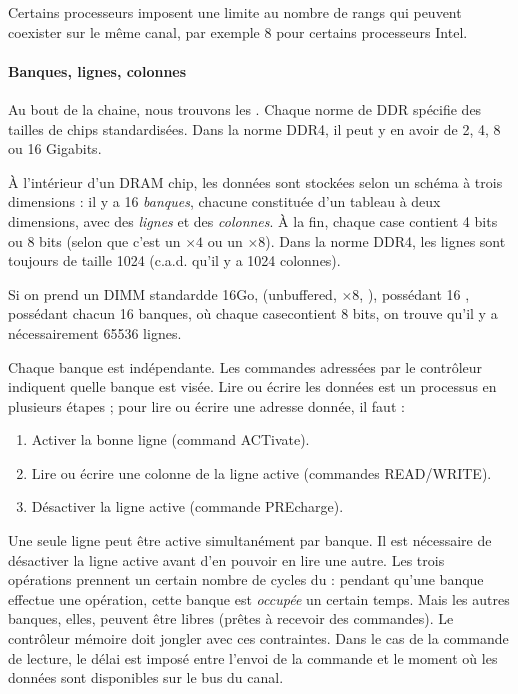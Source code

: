 \begin{danger}
  Certains processeurs imposent une limite au nombre de rangs qui peuvent
  coexister sur le même canal, par exemple 8 pour certains processeurs Intel.
\end{danger}

\paragraph{Banques, lignes, colonnes} Au bout de la chaine, nous trouvons les
. Chaque norme de DDR spécifie des tailles de chips
standardisées. Dans la norme DDR4, il peut y en avoir de 2, 4, 8 ou 16 Gigabits.

À l'intérieur d'un DRAM chip, les données sont stockées selon un schéma à trois
dimensions : il y a 16 \emph{banques}, chacune constituée d'un tableau à deux
dimensions, avec des \emph{lignes} et des \emph{colonnes}. À la fin, chaque case
contient 4 bits ou 8 bits (selon que c'est un $\times 4$ ou un $\times 8$). Dans
la norme DDR4, les lignes sont toujours de taille 1024 (c.a.d. qu'il y a 1024
colonnes).

\begin{myfilet}
  Si on prend un DIMM \og standard\fg de 16Go, (unbuffered, $\times 8$,
  ), possédant 16 , possédant chacun 16
  banques, où chaque \og case\fg contient 8 bits, on trouve qu'il y a
  nécessairement 65536 lignes.
\end{myfilet}

Chaque banque est indépendante. Les commandes adressées par le contrôleur
indiquent quelle banque est visée. Lire ou écrire les données est un processus
en plusieurs étapes ; pour lire ou écrire une adresse donnée, il faut :
\begin{enumerate}
\item Activer la bonne ligne (command ACTivate).
\item Lire ou écrire une colonne de la ligne active (commandes READ/WRITE).
\item Désactiver la ligne active (commande PREcharge).
\end{enumerate}

\medskip

Une seule ligne peut être active simultanément par banque. Il est nécessaire de
désactiver la ligne active avant d'en pouvoir en lire une autre. Les trois
opérations prennent un certain nombre de cycles du  : pendant
qu'une banque effectue une opération, cette banque est \emph{occupée} un certain
temps. Mais les autres banques, elles, peuvent être libres (prêtes à recevoir
des commandes). Le contrôleur mémoire doit jongler avec ces contraintes. Dans le
cas de la commande de lecture, le délai est imposé entre l'envoi de la commande
et le moment où les données sont disponibles sur le bus du canal.

